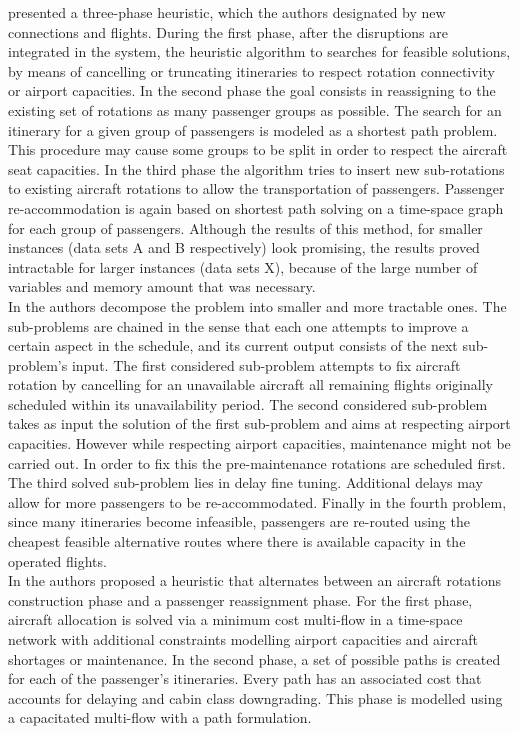 \documentclass[ijoo,nonblindrev]{informs-ijoo}
\begin{document}
\citep{jozefowiez2013} presented a three-phase heuristic, which the authors designated by new connections and flights. During the first phase, after the disruptions are integrated in the system, the heuristic algorithm to searches for feasible solutions, by means of cancelling or truncating itineraries to respect rotation connectivity or airport capacities. In the second phase the goal consists in reassigning to the existing set of rotations as many passenger groups as possible. The search for an itinerary for a given group of passengers is modeled as a shortest path problem. This procedure may cause some groups to be split in order to respect the aircraft seat capacities. In the third phase the algorithm tries to insert new sub-rotations to existing aircraft rotations to allow the transportation of passengers. Passenger re-accommodation is again based on shortest path solving on a time-space graph for each group of passengers. Although the results of this method, for smaller instances (data sets A and B respectively) look promising, the results proved intractable for larger instances (data sets X), because of the large number of variables and memory amount that was necessary.\\
In \citep{eggermont2009} the authors decompose the problem into smaller and more tractable ones. The sub-problems are chained in the sense that each one attempts to improve a certain aspect in the schedule, and its current output consists of the next sub-problem's input. The first considered sub-problem  attempts to fix aircraft rotation by cancelling for an unavailable aircraft all remaining flights originally scheduled within its unavailability period. The second considered sub-problem takes as input the solution of the first sub-problem and aims at respecting airport capacities. However while respecting airport capacities, maintenance might not be carried out. In order to fix this the pre-maintenance rotations are scheduled first. The third solved sub-problem lies in delay fine tuning. Additional delays may allow for more passengers to be re-accommodated. Finally in the fourth problem, since many itineraries become infeasible, passengers are re-routed using the cheapest feasible alternative routes where there is available capacity in the operated flights.\\
In \citep{darlay2009} the authors proposed a heuristic that alternates between an aircraft rotations construction phase and a passenger reassignment phase. For the first phase, aircraft allocation is solved via a minimum cost multi-flow in a time-space network with additional constraints modelling airport capacities and aircraft shortages or maintenance. In the second phase, a set of possible paths is created for each of the passenger's itineraries. Every path has an associated cost that accounts for delaying and cabin class downgrading. This phase is modelled using a capacitated multi-flow with a path formulation.\\
\end{document}
